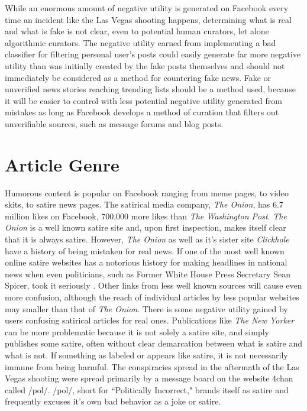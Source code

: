 \documentclass[12pt]{article}
\begin{document}
While an enormous amount of negative utility is generated on Facebook every time an incident like the Las Vegas shooting happens, determining what is real and what is fake is not clear, even to potential human curators, let alone algorithmic curators. The negative utility earned from implementing a bad classifier for filtering personal user's posts could easily generate far more negative utility than was initially created by the fake posts themselves and should not immediately be considered as a method for countering fake news. Fake or unverified news stories reaching trending lists should be a method used, because it will be easier to control with less potential negative utility generated from mistakes as long as Facebook develops a method of curation that filters out unverifiable sources, such as message forums and blog posts. 

\section{Article Genre}

Humorous content is popular on Facebook ranging from meme pages, to video skits, to satire news pages. The satirical media company, \textit{The Onion}, has 6.7 million likes on Facebook, 700,000 more likes than \textit{The Washington Post}. \textit{The Onion} is a well known satire site and, upon first inspection, makes itself clear that it is always satire. However, \textit{The Onion} as well as it's sister site \textit{Clickhole} have a history of being mistaken for real news. If one of the most well known online satire websites has a notorious history for making headlines in national news when even politicians, such as Former White House Press Secretary Sean Spicer, took it seriously \citep{spicey}. Other links from less well known sources will cause even more confusion, although the reach of individual articles by less popular websites may smaller than that of \textit{The Onion}. There is some negative utility gained by users confusing satirical articles for real ones. Publications like \textit{The New Yorker} can be more problematic because it is not solely a satire site, and simply publishes some satire, often without clear demarcation between what is satire and what is not. If something as labeled or appears like satire, it is not necessarily immune from being harmful. The conspiracies spread in the aftermath of the Las Vegas shooting were spread primarily by a message board on the website 4chan called /pol/. /pol/, short for ``Politically Incorrect," brands itself as satire and frequently excuses it's own bad behavior as a joke or satire.
\end{document}
